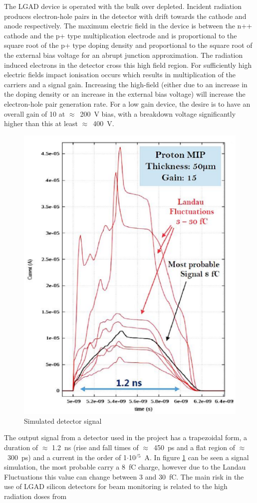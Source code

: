 \noindent The LGAD device is operated with the bulk over depleted. Incident radiation produces electron-hole
pairs in the detector with drift towards the cathode and anode respectively. The maximum
electric field in the device is between the n++ cathode and the p+ type multiplication electrode and is
proportional to the square root of the p+ type doping density and proportional to the square root of the
external bias voltage for an abrupt junction approximation.
The radiation induced electrons in the detector cross this high field region. For sufficiently
high electric fields impact ionisation occurs which results in multiplication of the carriers and a
signal gain.
Increasing the high-field (either due to an increase in the doping density or
an increase in the external bias voltage) will increase the electron-hole pair generation rate. For a
low gain device, the desire is to have an overall gain of 10 at $\approx$~200~V bias, with a breakdown voltage
significantly higher than this at least $\approx$~400~V.
\begin{figure}[H]
	\centering
	\includegraphics[width=0.35\linewidth]{IMG/ch2/LGAD_Signal}
	\caption{Simulated detector signal}
	\label{fig:signal}
\end{figure}
\noindent The output signal from a detector used in the project has a trapezoidal form, a duration of $\approx$ 1.2~ns (rise and fall times of $\approx$~450~ps and a 
flat region of $\approx$~300~ps) and a current in the order of 1$\cdot$10$^{/5}$~A.
In figure \ref{fig:signal} can be seen a signal simulation, the most probable carry a 8~fC charge, however due to the Landau Fluctuations this value can change between 3 and 30~fC.
\noindent The main risk in
the use of LGAD silicon detectors for beam monitoring is related to the high radiation doses from
